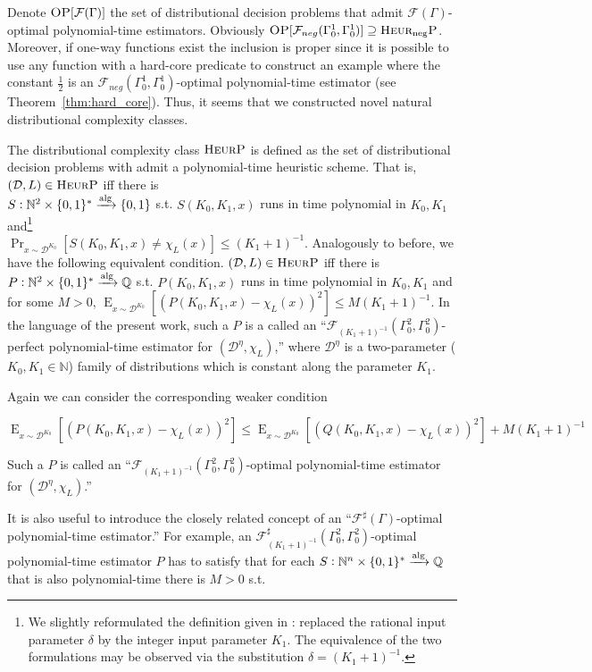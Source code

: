 \documentclass{article}
\numberwithin{equation}{section}
\theoremstyle{definition}
\theoremstyle{plain}
\newcommand{\Bool}{\{0,1\}}
\newcommand{\Words}{{\Bool^*}}
\DeclareMathOperator{\Prb}{Pr}
\DeclareMathOperator{\E}{E}
\newcommand{\Nats}{\mathbb{N}}
\newcommand{\Rats}{\mathbb{Q}}
\newcommand{\Dist}{\mathcal{D}}
\newcommand{\Fall}{\mathcal{F}}
\newcommand{\EG}{\Fall(\Gamma)}
\newcommand{\ESG}{\Fall^\sharp(\Gamma)}
\newcommand{\Alg}{\xrightarrow{\textnormal{alg}}}
\begin{document}
Denote ${\textsc{OP}[{\EG}]}$ the set of distributional decision problems that admit ${\EG}$-optimal polynomial-time estimators. Obviously ${\textsc{OP}[\Fall_{neg}(\Gamma_0^1,\Gamma_0^1)] \supseteq \textsc{Heur}_\text{neg}\textsc{P}}$. Moreover, if one-way functions exist the inclusion is proper since it is possible to use any function with a hard-core predicate to construct an example where the constant ${\frac{1}{2}}$ is an ${\Fall_{neg}(\Gamma_0^1,\Gamma_0^1)}$-optimal polynomial-time estimator (see Theorem~\ref{thm:hard_core}). Thus, it seems that we constructed novel natural distributional complexity classes.

The distributional complexity class ${\textsc{HeurP}}$ is defined as the set of distributional decision problems with admit a polynomial-time heuristic scheme\cite{Bogdanov_2006}. That is, ${(\Dist,L) \in \textsc{HeurP}}$ iff there is\\ ${S: \Nats^2 \times \Words \Alg \Bool}$ s.t. ${S(K_0,K_1,x)}$ runs in time polynomial in ${K_0, K_1}$ and\footnote{We slightly reformulated the definition given in \cite{Bogdanov_2006}: replaced the rational input parameter ${\delta}$ by the integer input parameter ${K_1}$. The equivalence of the two formulations may be observed via the substitution ${\delta=(K_1+1)^{-1}}$.}\\ ${\Prb_{x \sim \Dist^{K_0}}[S(K_0,K_1,x) \ne \chi_L(x)] \leq (K_1+1)^{-1}}$. Analogously to before, we have the following equivalent condition. ${(\Dist,L) \in \textsc{HeurP}}$ iff there is ${P: \Nats^2 \times \Words \Alg \Rats}$ s.t. ${P(K_0,K_1,x)}$ runs in time polynomial in ${K_0,K_1}$ and for some ${M > 0}$, ${\E_{x \sim \Dist^{K_0}}[(P(K_0,K_1,x)-\chi_L(x))^2] \leq M (K_1+1)^{-1}}$. In the language of the present work, such a ${P}$ is a called an \enquote{${\Fall_{(K_1+1)^{-1}}(\Gamma_0^2, \Gamma_0^2)}$-perfect polynomial-time estimator for ${(\Dist^\eta,\chi_L)}$,} where ${\Dist^\eta}$ is a two-parameter (${K_0,K_1 \in \Nats}$) family of distributions which is constant along the parameter ${K_1}$.

Again we can consider the corresponding weaker condition

\[\E_{x \sim \Dist^{K_0}}[(P(K_0,K_1,x)-\chi_L(x))^2] \leq \E_{x \sim \Dist^{K_0}}[(Q(K_0,K_1,x)-\chi_L(x))^2] + M (K_1+1)^{-1}\]

Such a ${P}$ is called an \enquote{${\Fall_{(K_1+1)^{-1}}(\Gamma_0^2,\Gamma_0^2)}$-optimal polynomial-time estimator for ${(\Dist^\eta,\chi_L)}$.}

It is also useful to introduce the closely related concept of an \enquote{${\ESG}$-optimal polynomial-time estimator.} For example, an ${\Fall_{(K_1+1)^{-1}}^\sharp(\Gamma_0^2,\Gamma_0^2)}$-optimal polynomial-time estimator ${P}$ has to satisfy that for each ${S: \Nats^n \times \Words \Alg \Rats}$ that is also polynomial-time there is ${M > 0}$ s.t.
\end{document}
